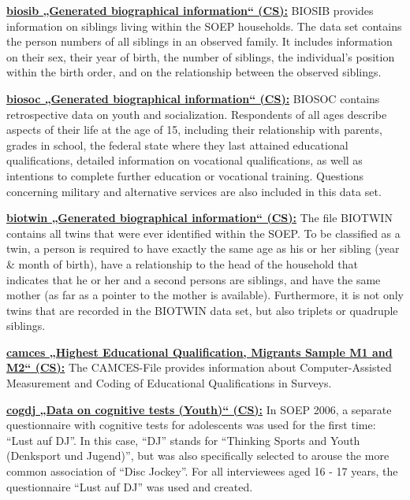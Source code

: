 \documentclass[letterpaper,10pt,openany,onesideH,english]{sphinxmanual}
\begin{document}
 \href{https://paneldata.org/soep-core/data/biosibd}{\textbf{biosib „Generated biographical information“ (CS):}} BIOSIB provides information on siblings living within the SOEP households. The data set contains the person numbers of all siblings in an observed family. It includes information on their sex, their year of birth, the number of siblings, the individual’s position within the birth order, and on the relationship between the observed siblings.

 \href{https://paneldata.org/soep-core/data/biosoc}{\textbf{biosoc „Generated biographical information“ (CS):}} BIOSOC contains retrospective data on youth and socialization. Respondents of all ages describe aspects of their life at the age of 15, including their relationship with parents, grades in school, the federal state where they last attained educational qualifications, detailed information on vocational qualifications, as well as intentions to complete further education or vocational training. Questions concerning military and alternative services are also included in this data set.

 \href{https://paneldata.org/soep-core/data/biotwin}{\textbf{biotwin „Generated biographical information“ (CS):}} The file BIOTWIN contains all twins that were ever identified within the SOEP. To be classified as a twin, a person is required to  have exactly the same age as his or her sibling (year \& month of birth), have a relationship to the head of the household that indicates that he or her and a second persons are siblings, and have the same mother (as far as a pointer to the mother is available). Furthermore, it is not only twins that are recorded in the BIOTWIN data set, but also triplets or quadruple siblings.

 \href{https://paneldata.org/soep-core/data/camces}{\textbf{camces „Highest Educational Qualification, Migrants Sample M1 and M2“ (CS):}} The CAMCES-File provides information about Computer-Assisted Measurement and Coding of Educational Qualifications in Surveys.

 \href{https://paneldata.org/soep-core/data/cogdj}{\textbf{cogdj „Data on cognitive tests (Youth)“ (CS):}} In SOEP 2006, a separate questionnaire with cognitive tests for adolescents was used for the first time: “Lust auf DJ”. In this case, “DJ” stands for “Thinking Sports and Youth (Denksport und Jugend)”, but was also specifically selected to arouse the more common association of “Disc Jockey”. For all interviewees aged 16 - 17 years, the questionnaire “Lust auf DJ” was used and created.
\end{document}
